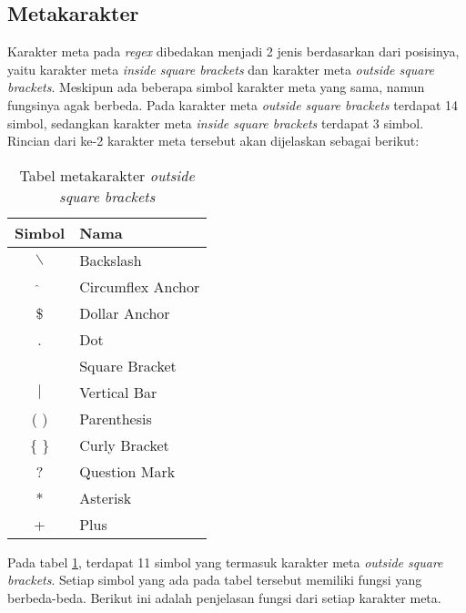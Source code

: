 \subsection{Metakarakter}

Karakter meta pada \textit{regex} dibedakan menjadi 2 jenis berdasarkan dari posisinya, yaitu karakter meta \textit{inside square brackets} dan karakter meta \textit{outside square brackets}. Meskipun ada beberapa simbol karakter meta yang sama, namun fungsinya agak berbeda. Pada karakter meta \textit{outside square brackets} terdapat 14 simbol, sedangkan karakter meta \textit{inside square brackets} terdapat 3 simbol. Rincian dari ke-2 karakter meta tersebut akan dijelaskan sebagai berikut:
	
\begin{table}[H]
	\renewcommand{\arraystretch}{1.5}
	\caption {Tabel metakarakter \textit{outside square brackets}} 
	\label{tab:metacharacters-outside}
	\begin{center}
		\begin{tabular}{|c|l|}
		\hline 
		Simbol & Nama \\ 
		\hline 
		$\backslash$ & Backslash \\ 
		\hline 
		$\hat{}$ & Circumflex Anchor\\ 
		\hline 
		\$ & Dollar Anchor\\ 
		\hline 
		. & Dot \\ 
		\hline 
		[ ] & Square Bracket \\ 
		\hline 
		$\vert$ & Vertical Bar \\ 
		\hline 
		( ) & Parenthesis \\ 
		\hline 
		$\lbrace$ $\rbrace$ & Curly Bracket \\ 
		\hline 
		? & Question Mark \\ 
		\hline 
		* & Asterisk \\ 
		\hline 
		+ & Plus \\ 
		\hline 
		\end{tabular} 
	\end{center}
\end{table}

Pada tabel \ref{tab:metacharacters-outside}, terdapat 11 simbol yang termasuk karakter meta \textit{outside square brackets}. Setiap simbol yang ada pada tabel tersebut memiliki fungsi yang berbeda-beda. Berikut ini adalah penjelasan fungsi dari setiap karakter meta.


